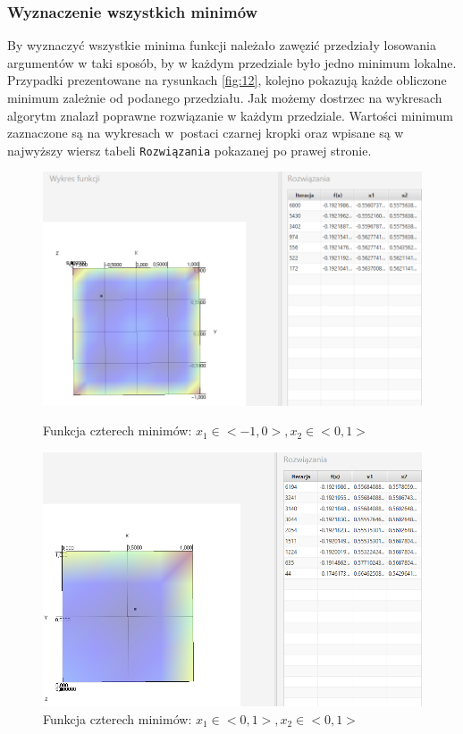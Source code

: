 \documentclass[10pt, a4paper]{article}
\begin{document}
\subsubsection{Wyznaczenie wszystkich minimów}
\label{subsubsec:fcn4min2}
By wyznaczyć wszystkie minima funkcji należało zawęzić przedziały losowania argumentów w taki sposób, by w każdym przedziale było jedno minimum lokalne. Przypadki prezentowane na rysunkach \ref{fig:12}, kolejno pokazują każde obliczone minimum zależnie od podanego przedziału. Jak możemy dostrzec na wykresach algorytm znalazł poprawne rozwiązanie w każdym przedziale. Wartości minimum zaznaczone są na wykresach w~postaci czarnej kropki oraz wpisane są w najwyższy wiersz tabeli {\tt Rozwiązania} pokazanej po prawej stronie. 
\begin{figure}[htbp]
	\begin{minipage}[b]{1\textwidth}
		\centering
		\includegraphics[width=\linewidth]{images/16e.PNG}
		\caption{Funkcja czterech minimów: $x_{1}\in<-1,0>,  x_{2}\in<0,1>$}
	\end{minipage}
	\begin{minipage}[b]{1\textwidth}
		\centering
		\includegraphics[width=\linewidth]{images/12e.PNG}
		\caption{Funkcja czterech minimów: $x_{1}\in<0,1>,  x_{2}\in<0,1>$}
	\end{minipage} 
\end{figure}
\end{document}
